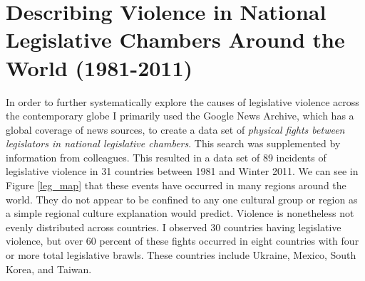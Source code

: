 \documentclass[a4paper]{article}\usepackage[]{graphicx}\usepackage[]{color}
\begin{document}
\section{Describing Violence in National Legislative Chambers Around the World (1981-2011)}

In order to further systematically explore the causes of legislative violence across the contemporary globe I primarily used the Google News Archive, which has a global coverage of news sources, to create a data set of {\emph{physical fights between legislators in national legislative chambers}}. This search was supplemented by information from colleagues. This resulted in a data set of 89 incidents of legislative violence in 31 countries between 1981 and Winter 2011. We can see in Figure \ref{leg_map} that these events have occurred in many regions around the world. They do not appear to be confined to any one cultural group or region as a simple regional culture explanation would predict. Violence is nonetheless not evenly distributed across countries. I observed 30 countries having legislative violence, but over 60 percent of these fights occurred in eight countries with four or more total legislative brawls. These countries include Ukraine, Mexico, South Korea, and Taiwan. 
\end{document}
